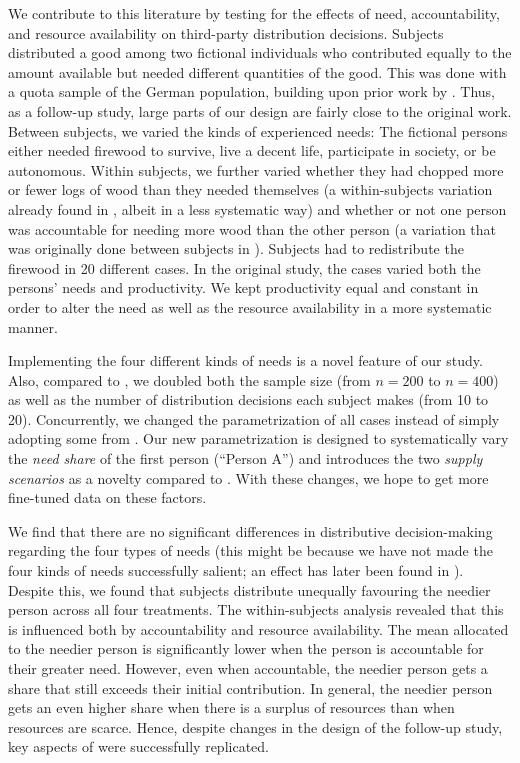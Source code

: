 \documentclass[egregdoesnotlikesansseriftitles]{scrartcl}
\begin{document}
We contribute to this literature by testing for the effects of need, accountability, and resource availability on third-party distribution decisions.
Subjects distributed a good among two fictional individuals who contributed equally to the amount available but needed different quantities of the good.
This was done with a quota sample of the German population, building upon prior work by \cite{bauer_need_2022}.
Thus, as a follow-up study, large parts of our design are fairly close to the original work.
Between subjects, we varied the kinds of experienced needs: The fictional persons either needed firewood to survive, live a decent life, participate in society, or be autonomous.
Within subjects, we further varied whether they had chopped more or fewer logs of wood than they needed themselves (a within-subjects variation already found in \citealt{bauer_need_2022}, albeit in a less systematic way) and whether or not one person was accountable for needing more wood than the other person (a variation that was originally done between subjects in \citealt{bauer_need_2022}).
Subjects had to redistribute the firewood in 20 different cases.
In the original study, the cases varied both the persons' needs and productivity.
We kept productivity equal and constant in order to alter the need as well as the resource availability in a more systematic manner.

Implementing the four different kinds of needs is a novel feature of our study.
Also, compared to \cite{bauer_need_2022}, we doubled both the sample size (from $n=200$ to $n=400$) as well as the number of distribution decisions each subject makes (from 10 to 20).
Concurrently, we changed the parametrization of all cases instead of simply adopting some from \cite{bauer_need_2022}.
Our new parametrization is designed to systematically vary the \textit{need share} of the first person (``Person A'') and introduces the two \textit{supply scenarios} as a novelty compared to \cite{bauer_need_2022}.
With these changes, we hope to get more fine-tuned data on these factors.

We find that there are no significant differences in distributive decision-making regarding the four types of needs (this might be because we have not made the four kinds of needs successfully salient; an effect has later been found in \citealt{bauer_winter_2023}).
Despite this, we found that subjects distribute unequally favouring the needier person across all four treatments.
The within-subjects analysis revealed that this is influenced both by accountability and resource availability.
The mean allocated to the needier person is significantly lower when the person is accountable for their greater need.
However, even when accountable, the needier person gets a share that still exceeds their initial contribution.
In general, the needier person gets an even higher share when there is a surplus of resources than when resources are scarce.
Hence, despite changes in the design of the follow-up study, key aspects of \citealt{bauer_need_2022} were successfully replicated.
\end{document}
